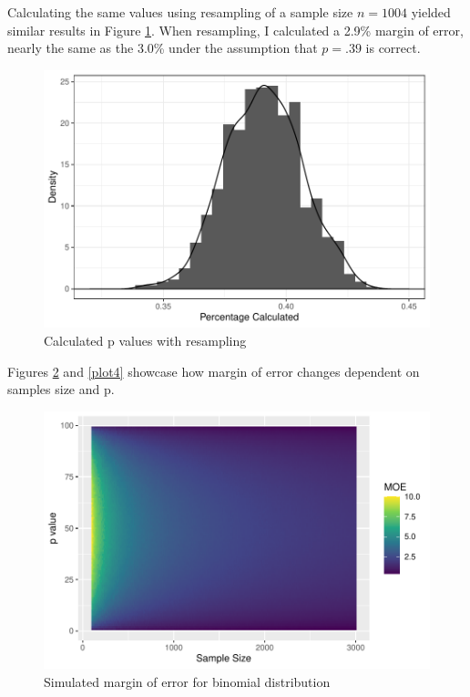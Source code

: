 \documentclass{article}\usepackage[]{graphicx}\usepackage[]{xcolor}
\begin{document}
\begin{multicols}{2}
Calculating the same values using resampling of a sample size $n=1004$ yielded similar results in Figure \ref{plot2}. When resampling, I calculated a 2.9\% margin of error, nearly the same as the 3.0\% under the assumption that $p=.39$ is correct.

\begin{figure}[H]
 \begin{center}
 \includegraphics[scale=0.45]{resample_plot.pdf}
 \caption{Calculated p values with resampling}
 \label{plot2}
 \end{center}
 \end{figure}
 
 Figures \ref{plot3} and \ref{plot4} showcase how margin of error changes dependent on samples size and p. 

\begin{figure}[H]
 \begin{center}
 \includegraphics[scale=0.6]{sim_moe.pdf}
 \caption{Simulated margin of error for binomial distribution}
 \label{plot3}
 \end{center}
 \end{figure}


\end{multicols}
\end{document}
